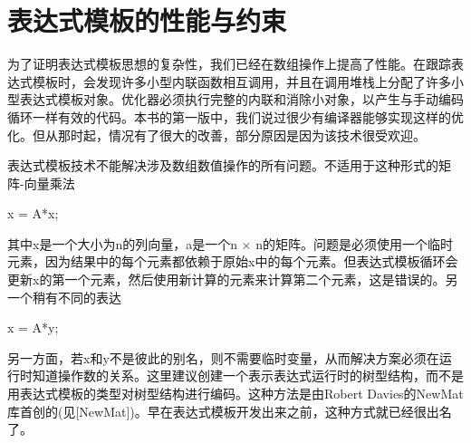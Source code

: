 \section{表达式模板的性能与约束}
为了证明表达式模板思想的复杂性，我们已经在数组操作上提高了性能。在跟踪表达式模板时，会发现许多小型内联函数相互调用，并且在调用堆栈上分配了许多小型表达式模板对象。优化器必须执行完整的内联和消除小对象，以产生与手动编码循环一样有效的代码。本书的第一版中，我们说过很少有编译器能够实现这样的优化。但从那时起，情况有了很大的改善，部分原因是因为该技术很受欢迎。

表达式模板技术不能解决涉及数组数值操作的所有问题。不适用于这种形式的矩阵-向量乘法

x = A*x;

其中x是一个大小为n的列向量，a是一个n × n的矩阵。问题是必须使用一个临时元素，因为结果中的每个元素都依赖于原始x中的每个元素。但表达式模板循环会更新x的第一个元素，然后使用新计算的元素来计算第二个元素，这是错误的。另一个稍有不同的表达

x = A*y;

另一方面，若x和y不是彼此的别名，则不需要临时变量，从而解决方案必须在运行时知道操作数的关系。这里建议创建一个表示表达式运行时的树型结构，而不是用表达式模板的类型对树型结构进行编码。这种方法是由Robert Davies的NewMat库首创的(见[NewMat])。早在表达式模板开发出来之前，这种方式就已经很出名了。

















































